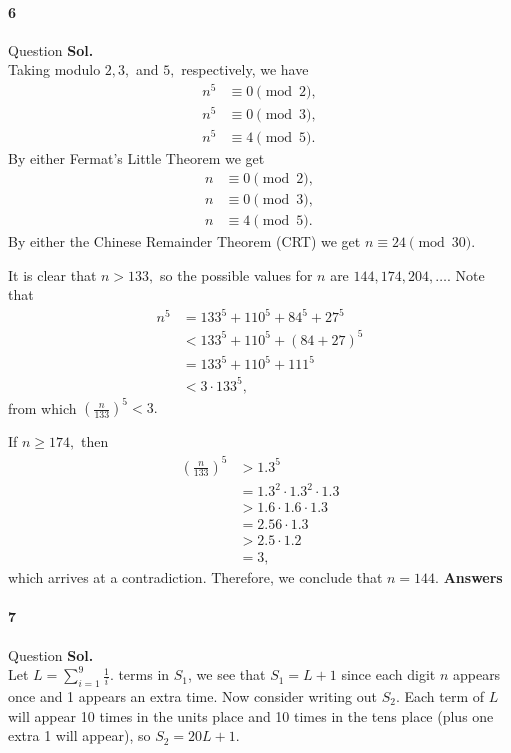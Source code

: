 \documentclass[12pt]{amsart}
\begin{document}
\paragraph*{6} Question
\bigskip
\textbf{Sol.} \\
Taking  modulo $2,3,$ and $5,$ respectively, we have\begin{align*} n^5&\equiv0\pmod{2}, \\ n^5&\equiv0\pmod{3}, \\ n^5&\equiv4\pmod{5}. \end{align*}By either Fermat's Little Theorem  we get\begin{align*} n&\equiv0\pmod{2}, \\ n&\equiv0\pmod{3}, \\ n&\equiv4\pmod{5}. \end{align*}By either the Chinese Remainder Theorem (CRT)  we get $n\equiv24\pmod{30}.$

It is clear that $n>133,$ so the possible values for $n$ are $144,174,204,\ldots.$ Note that\begin{align*} n^5&=133^5+110^5+84^5+27^5 \\ &<133^5+110^5+(84+27)^5 \\ &=133^5+110^5+111^5 \\ &<3\cdot133^5, \end{align*}from which $\left(\frac{n}{133}\right)^5<3.$

If $n\geq174,$ then\begin{align*} \left(\frac{n}{133}\right)^5&>1.3^5 \\ &=1.3^2\cdot1.3^2\cdot1.3 \\ &>1.6\cdot1.6\cdot1.3 \\ &=2.56\cdot1.3 \\ &>2.5\cdot1.2 \\ &=3, \end{align*}which arrives at a contradiction. Therefore, we conclude that $n={144}.$
\textbf{Answers}\\
\bigskip
\paragraph*{7} Question
\bigskip
\textbf{Sol.}
\\
Let $
L= \sum_{i=1}^{9}{\frac{1}{i}}$.  terms in $S_1$, we see that $S_1 = L + 1$ since each digit $n$ appears once and 1 appears an extra time. Now consider writing out $S_2$. Each term of $L$ will appear 10 times in the units place and 10 times in the tens place (plus one extra 1 will appear), so $S_2 = 20L + 1$.
\end{document}
